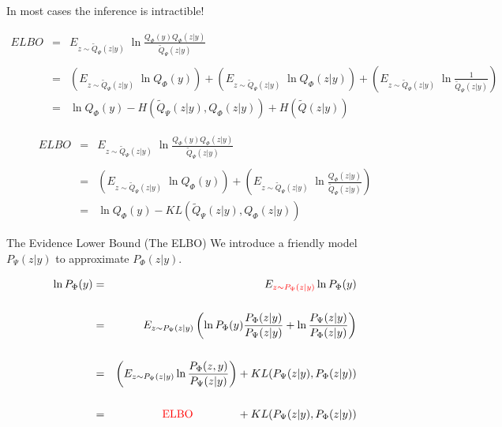 {\vfill
{\color{red} In most cases the inference is intractible!}


\begin{eqnarray*}
    ELBO & = & E_{z \sim \tilde{Q}_\Psi(z|y)}\;\ln \frac{Q_\Phi(y)Q_\Phi(z|y)}{\tilde{Q}_\Psi(z|y)} \\
    \\
    & = & \left(E_{z \sim \tilde{Q}_\Psi(z|y)}\;\ln Q_\Phi(y)\right) +
    \left(E_{z \sim \tilde{Q}_\Psi(z|y)}\;\ln Q_\Phi(z|y)\right)
    + \left(E_{z \sim \tilde{Q}_\Psi(z|y)}\;\ln \frac{1}{\tilde{Q}_\Psi(z|y)}\right) \\
    & = & \ln Q_\Phi(y) - H(\tilde{Q}_\Psi(z|y),Q_\Phi(z|y)) +  H(\tilde{Q}(z|y))
  \end{eqnarray*}

\slide{}

  \begin{eqnarray*}
    ELBO & = & E_{z \sim \tilde{Q}_\Psi(z|y)}\;\ln \frac{Q_\Phi(y)Q_\Phi(z|y)}{\tilde{Q}_\Psi(z|y)} \\
    \\
    & = & \left(E_{z \sim \tilde{Q}_\Psi(z|y)}\;\ln Q_\Phi(y)\right) +
    \left(E_{z \sim \tilde{Q}_\Psi(z|y)}\;\ln \frac{Q_\Phi(z|y)}{\tilde{Q}_\Psi(z|y)}\right) \\
    & = & \ln Q_\Phi(y) - KL(\tilde{Q}_\Psi(z|y),Q_\Phi(z|y))
  \end{eqnarray*}

{The Evidence Lower Bound (The ELBO)}
We introduce a friendly model {\color{red} $P_\Psi(z|y)$} to approximate {\color{red} $P_\Phi(z|y)$}.

{\huge
\begin{eqnarray*}
        \ln P_\Phi(y) & = & E_{\color{red} z \sim P_\Psi(z|y)} \ln P_\Phi(y) \\
\\
 & = & E_{z \sim P_\Psi(z|y)} \left(\ln P_\Phi(y)\frac{P_\Phi(z|y)}{P_\Psi(z|y)} + \ln \frac{P_\Psi(z|y)}{P_\Phi(z|y)}\right) \\
 \\
  & = & \left(E_{z \sim P_\Psi(z|y)} \ln \frac{P_\Phi(z,y)}{P_\Psi(z|y)}\right) + KL(P_\Psi(z|y),P_\Phi(z|y)) \\
  \\
  & = & \hspace{4em} \mathrm{\color{red} ELBO} \hspace{4em}  + KL(P_\Psi(z|y),P_\Phi(z|y))
\end{eqnarray*}
}

}
